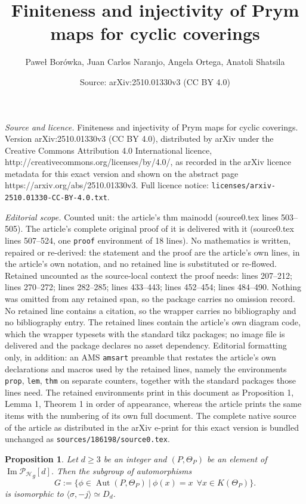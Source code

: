 \documentclass[10pt,a4paper]{amsart}
\title{Finiteness and injectivity of Prym maps for cyclic coverings}
\author{Pawe{\l} Bor\'owka, Juan Carlos Naranjo, Angela Ortega, Anatoli Shatsila}
\date{Source: arXiv:2510.01330v3 (CC BY 4.0)}
\newtheorem{prop}{Proposition}
\DeclareMathOperator{\Aut}{Aut}
\DeclareMathOperator{\Image}{Im}
\begin{document}
\maketitle

\noindent\emph{Source and licence.} Finiteness and injectivity of Prym maps for cyclic coverings. Version arXiv:2510.01330v3 (CC BY 4.0), distributed by arXiv under the Creative Commons Attribution 4.0 International licence, http://creativecommons.org/licenses/by/4.0/, as recorded in the arXiv licence metadata for this exact version and shown on the abstract page https://arxiv.org/abs/2510.01330v3. Full licence notice: \texttt{licenses/arxiv-2510.01330-CC-BY-4.0.txt}.\par\smallskip

\noindent\textit{Editorial scope.} Counted unit: the article's thm mainodd (source0.tex lines 503--505). The article's complete original proof of it is delivered with it (source0.tex lines 507--524, one \texttt{proof} environment of 18 lines). No mathematics is written, repaired or re-derived: the statement and the proof are the article's own lines, in the article's own notation, and no retained line is substituted or re-flowed.  Retained uncounted as the source-local context the proof needs: lines 207--212; lines 270--272; lines 282--285; lines 433--443; lines 452--454; lines 484--490.  Nothing was omitted from any retained span, so the package carries no omission record.  No retained line contains a citation, so the wrapper carries no bibliography and no bibliography entry.  The retained lines contain the article's own diagram code, which the wrapper typesets with the standard tikz packages; no image file is delivered and the package declares no asset dependency.  Editorial formatting only, in addition: an AMS \texttt{amsart} preamble that restates the article's own declarations and macros used by the retained lines, namely the environments \texttt{prop}, \texttt{lem}, \texttt{thm} on separate counters, together with the standard packages those lines need.  The retained environments print in this document as Proposition 1, Lemma 1, Theorem 1 in order of appearance, whereas the article prints the same items with the numbering of its own full document.  The complete native source of the article as distributed in the arXiv e-print for this exact version is bundled unchanged as \texttt{sources/186198/source0.tex}.
\begin{prop}
\label{group}
    Let $d \geq 3$ be an integer and $(P, \Theta_P)$ be an element of $\Image\mathcal{P_H}_g[d]$. 
    Then the subgroup of automorphisms $$G := \{ \phi \in \Aut(P,\Theta_P) \: | \: \phi(x) = x \:\: \forall x \in K(\Theta_P)\}.$$
    is isomorphic to $\langle \sigma, -j \rangle \simeq {D}_{d}$.
\end{prop}
\end{document}
